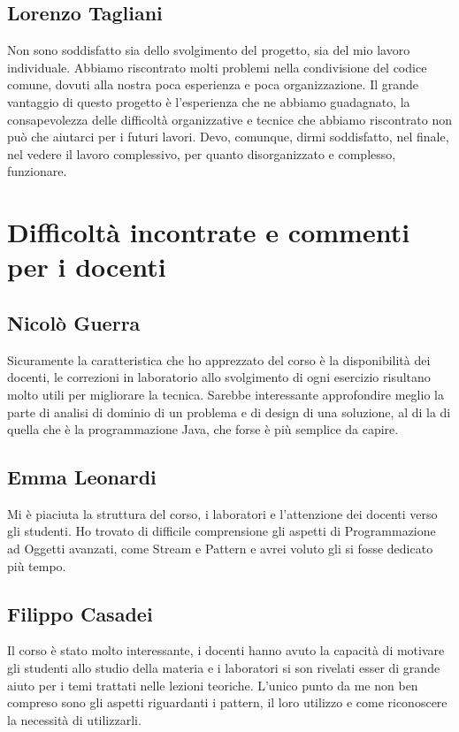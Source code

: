 \documentclass[a4paper,12pt]{report}
\begin{document}
\subsection{Lorenzo Tagliani}
Non sono soddisfatto sia dello svolgimento del progetto, sia del mio lavoro individuale. Abbiamo riscontrato molti problemi nella condivisione del codice comune, dovuti
alla nostra poca esperienza e poca organizzazione. Il grande vantaggio di questo progetto è l'esperienza che ne abbiamo guadagnato, la consapevolezza delle difficoltà
organizzative e tecnice che abbiamo riscontrato non può che aiutarci per i futuri lavori.
Devo, comunque, dirmi soddisfatto, nel finale, nel vedere il lavoro complessivo, per quanto disorganizzato e complesso, funzionare. 

\section{Difficoltà incontrate e commenti per i docenti}
\subsection{Nicolò Guerra}
Sicuramente la caratteristica che ho apprezzato del corso è la disponibilità dei docenti, le correzioni in laboratorio allo svolgimento di ogni esercizio risultano molto utili per migliorare la tecnica.
Sarebbe interessante approfondire meglio la parte di analisi di dominio di un problema e di design di una soluzione, al di la di quella che è la programmazione Java, che forse è più semplice da capire.

\subsection{Emma Leonardi}
Mi è piaciuta la struttura del corso, i laboratori e l'attenzione dei docenti verso gli studenti. 
Ho trovato di difficile comprensione gli aspetti di Programmazione ad Oggetti avanzati, come Stream e Pattern e avrei voluto gli si fosse dedicato più tempo.

\subsection{Filippo Casadei}
Il corso è stato molto interessante, i docenti hanno avuto la capacità di motivare gli studenti allo studio della materia e i laboratori si son rivelati esser di grande aiuto per i temi trattati nelle lezioni teoriche.
L'unico punto da me non ben compreso sono gli aspetti riguardanti i pattern, il loro utilizzo e come riconoscere la necessità di utilizzarli.
\end{document}
